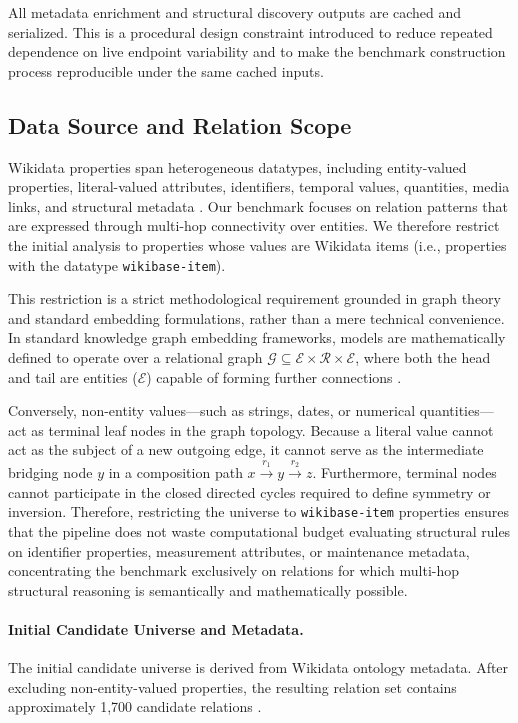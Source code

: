 \documentclass[12pt,a4paper]{article}
\begin{document}
All metadata enrichment and structural discovery outputs are cached and serialized. This is a procedural design constraint introduced to reduce repeated dependence on live endpoint variability and to make the benchmark construction process reproducible under the same cached inputs.

\subsection{Data Source and Relation Scope}

Wikidata properties span heterogeneous datatypes, including entity-valued properties, literal-valued attributes, identifiers, temporal values, quantities, media links, and structural metadata \cite{vrandecic2014wikidata}. Our benchmark focuses on relation patterns that are expressed through multi-hop connectivity over entities. We therefore restrict the initial analysis to properties whose values are Wikidata items (i.e., properties with the datatype \texttt{wikibase-item}).

This restriction is a strict methodological requirement grounded in graph theory and standard embedding formulations, rather than a mere technical convenience. In standard knowledge graph embedding frameworks, models are mathematically defined to operate over a relational graph $\mathcal{G} \subseteq \mathcal{E} \times \mathcal{R} \times \mathcal{E}$, where both the head and tail are entities ($\mathcal{E}$) capable of forming further connections \cite{sun2019rotate,ali2022bringing}. 

Conversely, non-entity values---such as strings, dates, or numerical quantities---act as terminal leaf nodes in the graph topology. Because a literal value cannot act as the subject of a new outgoing edge, it cannot serve as the intermediate bridging node $y$ in a composition path $x \xrightarrow{r_1} y \xrightarrow{r_2} z$. Furthermore, terminal nodes cannot participate in the closed directed cycles required to define symmetry or inversion. Therefore, restricting the universe to \texttt{wikibase-item} properties ensures that the pipeline does not waste computational budget evaluating structural rules on identifier properties, measurement attributes, or maintenance metadata, concentrating the benchmark exclusively on relations for which multi-hop structural reasoning is semantically and mathematically possible.

\paragraph{Initial Candidate Universe and Metadata.}
The initial candidate universe is derived from Wikidata ontology metadata. After excluding non-entity-valued properties, the resulting relation set contains approximately 1,700 candidate relations \cite{wikidata_list_properties_2025}. 
\end{document}
